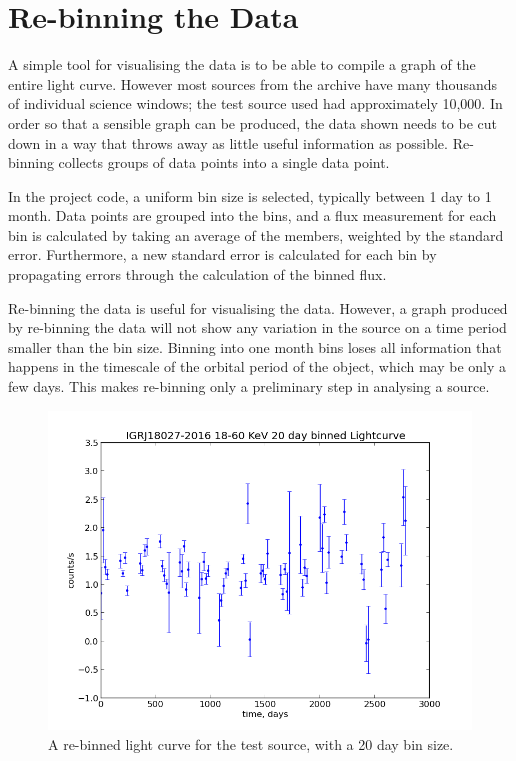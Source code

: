 \section{Re-binning the Data}
A simple tool for visualising the data is to be able to compile a graph of the entire light curve. However most sources from the archive have many thousands of individual science windows; the test source used had approximately 10,000. In order so that a sensible graph can be produced, the data shown needs to be cut down in a way that throws away as little useful information as possible. Re-binning collects groups of data points into a single data point. 

In the project code, a uniform bin size is selected, typically between 1 day to 1 month. Data points are grouped into the bins, and a flux measurement for each bin is calculated by taking an average of the members, weighted by the standard error. Furthermore, a new standard error is calculated for each bin by propagating errors through the calculation of the binned flux.

Re-binning the data is useful for visualising the data. However, a graph produced by re-binning the data will not show any variation in the source on a time period smaller than the bin size. Binning into one month bins loses all information that happens in the timescale of the orbital period of the object, which may be only a few days. This makes re-binning only a preliminary step in analysing a source. 

\begin{figure}[h!]
\centering
\includegraphics[width=130mm]{gfx/Fig2.png}
\caption{A re-binned light curve for the test source, with a 20 day bin size.}
\label{Figure 2}
\end{figure}

